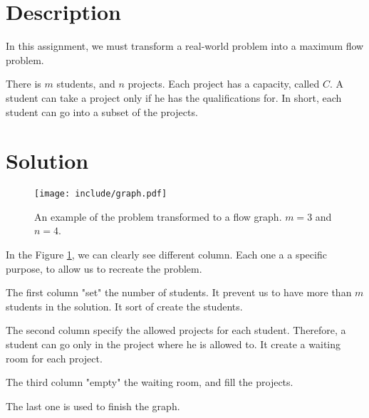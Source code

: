 \section{Description}
    In this assignment, we must transform a real-world problem into a maximum flow problem.

    There is $m$ students, and $n$ projects. Each project has a capacity, called $C$. A student can take a project only if he has the qualifications for. In short, each student can go into a subset of the projects.


\section{Solution}
    \begin{figure}
        \texttt{[image: include/graph.pdf]}
        \caption{An example of the problem transformed to a flow graph. $m=3$ and $n=4$.}
        \label{fig:graph}
    \end{figure}

    In the Figure \ref{fig:graph}, we can clearly see different column. Each one a a specific purpose, to allow us to recreate the problem.

    The first column "set" the number of students. It prevent us to have more than $m$ students in the solution. It sort of create the students.

    The second column specify the allowed projects for each student. Therefore, a student can go only in the project where he is allowed to. It create a waiting room for each project.

    The third column "empty" the waiting room, and fill the projects. 

    The last one is used to finish the graph.